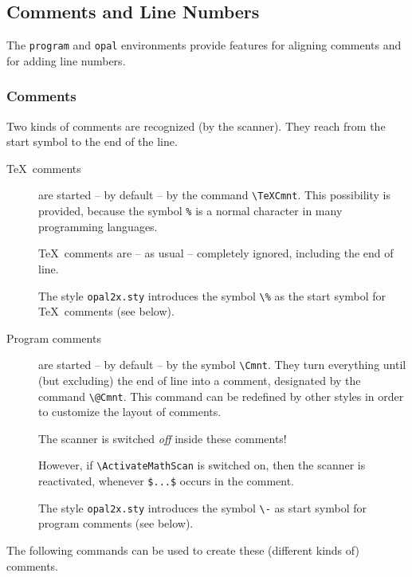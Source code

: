 
\subsection{Comments and Line Numbers}

The \texttt{program} and \texttt{opal} environments provide features for
aligning comments and for adding line numbers.


\subsubsection*{Comments}

Two kinds of comments are recognized (by the scanner). They reach from
the start symbol to the end of the line.


\begin{description}
  \item[\TeX~comments] are started -- by default -- by the command
    \verb=\TeXCmnt=. This possibility is provided, because the symbol
    \verb=%= is a normal character in many programming languages.

    \TeX~comments are -- as usual -- completely ignored, including the end
    of line.

    The style \texttt{opal2x.sty} introduces the symbol \verb=\%= as the
    start symbol for \TeX~comments (see below).
    
  \item[Program comments] are started -- by default -- by the symbol
    \verb=\Cmnt=. They turn everything until (but excluding) the end of
    line into a comment, designated by the command \verb=\@Cmnt=. This
    command can be redefined by other styles in order to customize the
    layout of comments.

    The scanner is switched \emph{off} inside these comments!

    However, if \verb=\ActivateMathScan= is switched on, then the scanner
    is reactivated, whenever \verb=$...$= occurs in the comment.
                                                    
    The style \texttt{opal2x.sty} introduces the symbol \verb=\-= as start
    symbol for program comments (see below).

\end{description}
 

The following commands can be used to create these (different kinds of)
comments.

